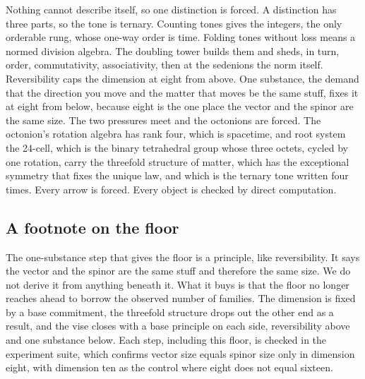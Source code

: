 Nothing cannot describe itself, so one distinction is forced. A distinction has three parts, so the tone is ternary. Counting tones gives the integers, the only orderable rung, whose one-way order is time. Folding tones without loss means a normed division algebra. The doubling tower builds them and sheds, in turn, order, commutativity, associativity, then at the sedenions the norm itself. Reversibility caps the dimension at eight from above. One substance, the demand that the direction you move and the matter that moves be the same stuff, fixes it at eight from below, because eight is the one place the vector and the spinor are the same size. The two pressures meet and the octonions are forced. The octonion's rotation algebra has rank four, which is spacetime, and root system the 24-cell, which is the binary tetrahedral group whose three octets, cycled by one rotation, carry the threefold structure of matter, which has the exceptional symmetry that fixes the unique law, and which is the ternary tone written four times. Every arrow is forced. Every object is checked by direct computation.

\subsection*{A footnote on the floor}

The one-substance step that gives the floor is a principle, like reversibility. It says the vector and the spinor are the same stuff and therefore the same size. We do not derive it from anything beneath it. What it buys is that the floor no longer reaches ahead to borrow the observed number of families. The dimension is fixed by a base commitment, the threefold structure drops out the other end as a result, and the vise closes with a base principle on each side, reversibility above and one substance below. Each step, including this floor, is checked in the experiment suite, which confirms vector size equals spinor size only in dimension eight, with dimension ten as the control where eight does not equal sixteen.
